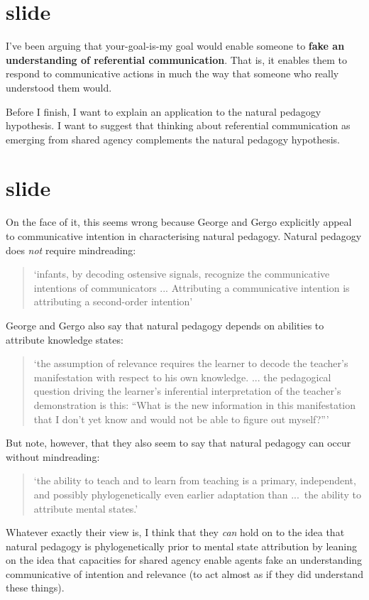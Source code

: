 \documentclass[12pt,\papersize]{extarticle}
\begin{document}
\section{slide}
I've been arguing that your-goal-is-my goal would enable someone to \textbf{fake an understanding of referential communication}.
That is, it enables them to respond to communicative actions in much the way that someone who really understood them would.

Before I finish, I want to explain an application to the natural pedagogy hypothesis.
I want to suggest that thinking about referential communication as emerging from shared agency complements the natural pedagogy hypothesis.

\section{slide}
On the face of it,
this seems wrong because George and Gergo explicitly appeal to communicative intention in characterising natural pedagogy.
Natural pedagogy does \emph{not} require mindreading:
\begin{quote}
`infants, by decoding ostensive signals, recognize the communicative intentions of communicators ... Attributing a communicative intention is attributing a second-order intention' \citep{csibra:2010_recognizing} %
\end{quote}
%
George and Gergo also say that natural pedagogy depends on abilities to attribute knowledge states:
%
\begin{quote}
`the assumption of relevance requires the learner to decode the teacher's manifestation with respect to his own knowledge.  ...  the pedagogical question driving the learner's inferential interpretation of the teacher’s demonstration is this: ``What is the new information in this manifestation that I don’t yet know and would not be able to figure out myself?''' \citep{Csibra:2005zr} %
\end{quote}
%
But note, however, that they also seem to say that natural pedagogy can occur without mindreading:
%
\begin{quote}
‘the ability to teach and to learn from teaching is a primary, independent, and possibly phylogenetically even earlier adaptation than ...\ the ability to attribute mental states.' \citep{Gergely:2012np} %
\end{quote}
%
Whatever exactly their view is,
I think that they \emph{can} hold on to the idea that natural pedagogy is phylogenetically prior to mental state attribution by leaning on the idea that capacities for shared agency enable agents fake an understanding communicative of intention and relevance (to act almost as if they did understand these things).
\end{document}
